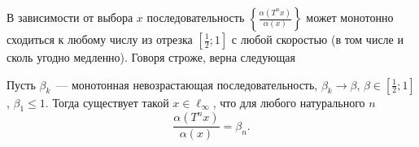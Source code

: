 В зависимости от выбора $x$ последовательность $\left\{\frac{\alpha(T^n x)}{\alpha(x)}\right\}$
может монотонно сходиться к любому числу из отрезка $\left[\frac{1}{2}; 1\right]$ с любой скоростью
(в том числе и сколь угодно медленно).
Говоря строже, верна следующая

\begin{theorem}
	\label{thm:alpha_beta_T_seq}
	Пусть $\beta_k$~--- монотонная невозрастающая последовательность,
	$\beta_k \to \beta$, $\beta\in\left[\frac{1}{2}; 1\right]$, $\beta_1 \leq 1$.
	Тогда существует такой $x\in\ell_\infty$, что для любого натурального $n$
	\begin{equation}
		\frac{\alpha(T^n x)}{\alpha(x)} = \beta_n.
	\end{equation}
\end{theorem}

